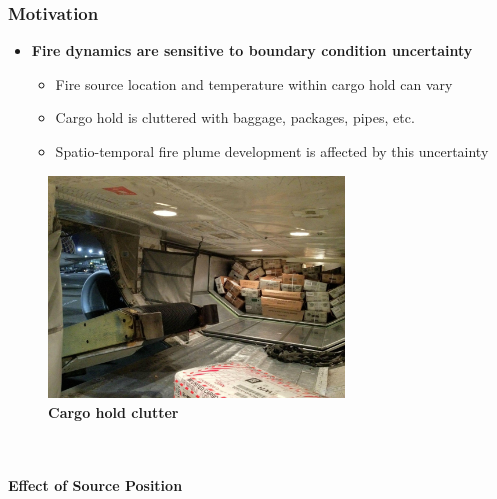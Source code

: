 \documentclass[9pt]{beamer}
\begin{document}
\begin{frame}
\frametitle{Motivation}
\label{sec-5-3}

\begin{itemize}
\item \textbf{Fire dynamics are sensitive to boundary condition uncertainty}
\begin{itemize}
\item Fire source location and temperature within cargo hold can vary
\item Cargo hold is cluttered with baggage, packages, pipes, etc.
\item Spatio-temporal fire plume development is affected by this uncertainty
\end{itemize}
\end{itemize}

\begin{minipage}[b]{0.45\linewidth}
\centering
\begin{figure}[ht]
\includegraphics[width=0.7\textwidth]{CargoHoldClutter} \\
\textbf{Cargo hold clutter}
\end{figure}
\end{minipage}
\begin{minipage}[b]{0.45\linewidth}
\centering
{} \\
 \\
\textbf{Effect of Source Position}
\end{minipage}
\end{frame}
\end{document}
